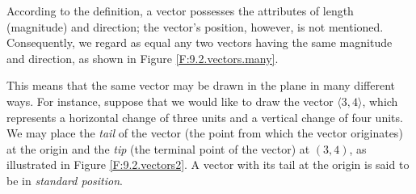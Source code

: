 According to the definition, a vector possesses the attributes of
length (magnitude) and direction; the vector's position, however, is
not mentioned.  Consequently, we regard as equal any two vectors having the
same magnitude and direction, as shown in Figure
\ref{F:9.2.vectors.many}.

\vspace*{5pt}
\nin 
\begin{center}
\end{center}
\vspace*{5pt}

This means that the same vector may be drawn in the plane in many
different ways.  For instance, suppose that we would like to draw the
vector $\langle 3, 4\rangle$, which
represents a horizontal
change of three units and a vertical change of four units.
We may place the \emph{tail} of the vector (the point from which the
vector originates) at the origin and the \emph{tip} (the terminal
point of the vector) at $(3,4)$, as illustrated in Figure
\ref{F:9.2.vectors2}.  A vector with its tail at the origin is
said to be in \emph{standard position}.

